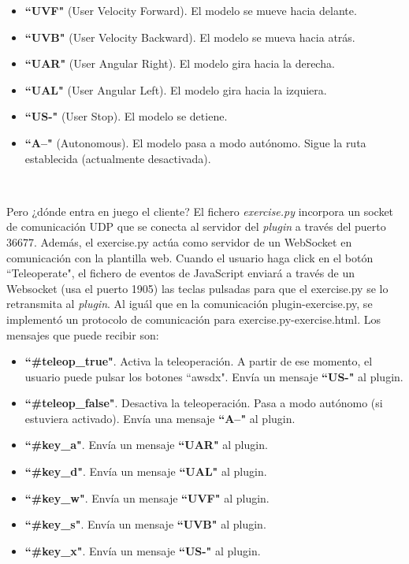 \begin{itemize}
	\item \textbf{``UVF"} (User Velocity Forward). El modelo se mueve hacia delante.
	\item \textbf{``UVB"} (User Velocity Backward). El modelo se mueva hacia atrás.
	\item \textbf{``UAR"} (User Angular Right). El modelo gira hacia la derecha.
	\item \textbf{``UAL"} (User Angular Left). El modelo gira hacia la izquiera.
	\item \textbf{``US-"} (User Stop). El modelo se detiene.
	\item \textbf{``A--"} (Autonomous). El modelo pasa a modo autónomo. Sigue la ruta establecida (actualmente desactivada).
\end{itemize}\

Pero ¿dónde entra en juego el cliente? El fichero \textit{exercise.py} incorpora un socket de comunicación UDP que se conecta al servidor del \textit{plugin} a través del puerto 36677. Además, el exercise.py actúa como servidor de un WebSocket en comunicación con la plantilla web. Cuando el usuario haga click en el botón ``Teleoperate", el fichero de eventos de JavaScript enviará a través de un Websocket (usa el puerto 1905) las teclas pulsadas para que el exercise.py se lo retransmita al \textit{plugin}. Al iguál que en la comunicación plugin-exercise.py, se implementó un protocolo de comunicación para exercise.py-exercise.html. Los mensajes que puede recibir son:\\

\begin{itemize}
	\item \textbf{``\#teleop\_true"}. Activa la teleoperación. A partir de ese momento, el usuario puede pulsar los botones ``awsdx". Envía un mensaje \textbf{``US-"} al plugin.
	\item \textbf{``\#teleop\_false"}. Desactiva la teleoperación. Pasa a modo autónomo (si estuviera activado). Envía una mensaje \textbf{``A--"} al plugin.
	\item \textbf{``\#key\_a"}. Envía un mensaje \textbf{``UAR"} al plugin.
	\item \textbf{``\#key\_d"}. Envía un mensaje \textbf{``UAL"} al plugin.
	\item \textbf{``\#key\_w"}. Envía un mensaje \textbf{``UVF"} al plugin.
	\item \textbf{``\#key\_s"}. Envía un mensaje \textbf{``UVB"} al plugin.
	\item \textbf{``\#key\_x"}. Envía un mensaje \textbf{``US-"} al plugin.
\end{itemize}\

